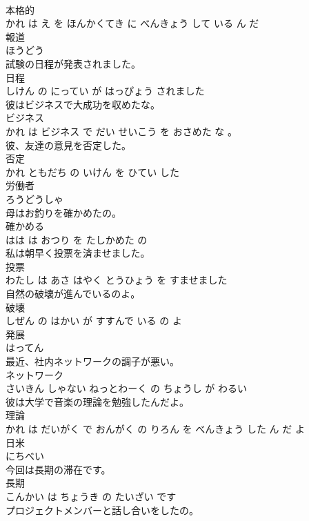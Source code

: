 \documentclass[8pt]{extreport}
\begin{document}
\begin{CJK}{UTF8}{min}
\\	本格的 
\\	かれ は え を ほんかくてき に べんきょう して いる ん だ			
\\	報道	
\\	ほうどう			
\\	試験の日程が発表されました。	
\\	日程 
\\	しけん の にってい が はっぴょう されました			
\\	彼はビジネスで大成功を収めたな。	
\\	ビジネス 
\\	かれ は ビジネス で だい せいこう を おさめた な 。			
\\	彼、友達の意見を否定した。	
\\	否定 
\\	かれ ともだち の いけん を ひてい した			
\\	労働者	
\\	ろうどうしゃ			
\\	母はお釣りを確かめたの。	
\\	確かめる 
\\	はは は おつり を たしかめた の			
\\	私は朝早く投票を済ませました。	
\\	投票 
\\	わたし は あさ はやく とうひょう を すませました			
\\	自然の破壊が進んでいるのよ。	
\\	破壊 
\\	しぜん の はかい が すすんで いる の よ			
\\	発展	
\\	はってん			
\\	最近、社内ネットワークの調子が悪い。	
\\	ネットワーク 
\\	さいきん しゃない ねっとわーく の ちょうし が わるい			
\\	彼は大学で音楽の理論を勉強したんだよ。	
\\	理論 
\\	かれ は だいがく で おんがく の りろん を べんきょう した ん だ よ			
\\	日米	
\\	にちべい			
\\	今回は長期の滞在です。	
\\	長期 
\\	こんかい は ちょうき の たいざい です			
\\	プロジェクトメンバーと話し合いをしたの。	

\end{CJK}
\end{document}
